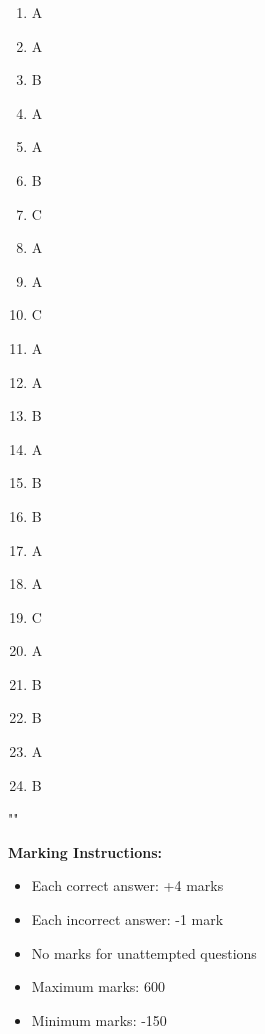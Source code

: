 \documentclass[9pt]{article}
\begin{document}
\begin{multicols}{5}
\begin{enumerate}
\item A
\item A
\item B
\item A
\item A
\item B
\item C
\item A
\item A
\item C
\item A
\item A
\item B
\item A
\item B
\item B
\item A
\item A
\item C
\item A
\item B
\item B
\item A
\item B
\end{enumerate}
\end{multicols}""

\vspace{2em}

\begin{center}
\textbf{Marking Instructions:}
\begin{itemize}
\item Each correct answer: +4 marks
\item Each incorrect answer: -1 mark
\item No marks for unattempted questions
\item Maximum marks: 600
\item Minimum marks: -150
\end{itemize}
\end{center}
\end{document}

